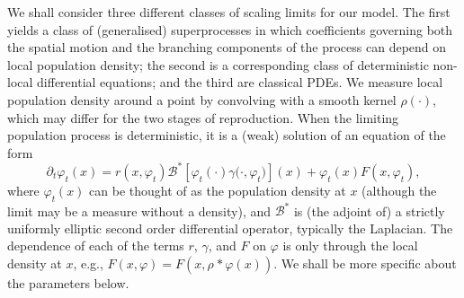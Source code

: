 \documentclass[EJP]{ejpecp} %
\newcommand{\DG}{\mathcal{B}}  %
\newcommand{\kernel}{\rho}  %
\newcommand{\smooth}[1]{\kernel_{#1} \! * \!}  %
\begin{document}
We shall consider three different classes of scaling limits for our model.
The first yields a class of (generalised) superprocesses in which coefficients 
governing both the spatial motion and the branching components of the process can depend
on local population density; the second is a corresponding class of deterministic
non-local differential equations; and the third are classical PDEs.
We measure local population density around a point by convolving with
a smooth kernel $\rho(\cdot)$, which may differ
for the two stages of reproduction. 
When the limiting population process is deterministic,
it is a (weak) solution of an equation of the form
\begin{equation}
	\label{general deterministic limit}
        \partial_t \varphi_t(x)
        =
        r\left(x, \varphi_t \right)
        \DG^* \left[
            \varphi_t(\cdot)
            \gamma\big(\cdot, \varphi_t \big)
        \right](x)
        +
        \varphi_t(x)
        F\left(x, \varphi_t \right)
        ,
\end{equation}
where
$\varphi_t(x)$ can be thought of as the population density at $x$
(although the limit may be a measure without a density), and
$\DG^*$ is (the adjoint of) a strictly uniformly elliptic second order differential operator, typically the Laplacian.
The dependence of each of the terms $r$, $\gamma$, and $F$ on $\varphi$ is only through the local density at $x$,
e.g., $F(x, \varphi) = F(x, \smooth{} \varphi(x))$.
We shall be more specific about the parameters below. 
\end{document}

